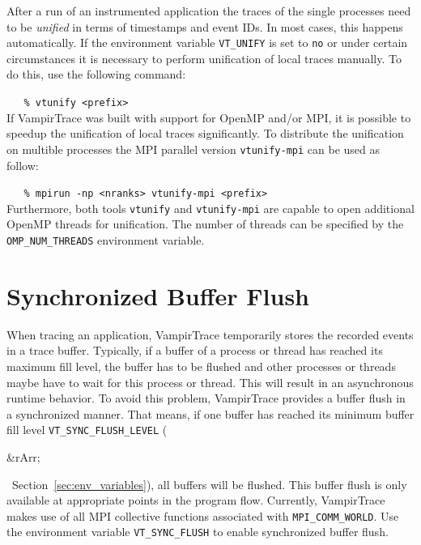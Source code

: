 \documentclass[a4paper,twoside,12pt,BCOR12mm]{scrbook}
\newcommand{\rarr}{$\Rightarrow$}  %
\renewcommand{\rarr}{\begin{rawhtml}&rArr;\end{rawhtml}}   %
\begin{document}
After a run of an instrumented application the traces of the single
processes need to be \textit{unified} in terms of timestamps and event IDs.
In most cases, this happens automatically.
If the environment variable \texttt{VT\_UNIFY} is set to \texttt{no} or under
certain circumstances it is necessary to perform unification of local traces
manually. To do this, use the following command:

\vspace{1ex}
\verb|   % vtunify <prefix>|
\vspace{1ex}\\

If VampirTrace was built with support for OpenMP and/or MPI, it is possible to
speedup the unification of local traces significantly. To distribute the unification
on multible processes the MPI parallel version \texttt{vtunify-mpi} can be used as
follow:

\vspace{1ex}
\verb|   % mpirun -np <nranks> vtunify-mpi <prefix>|
\vspace{1ex}\\

Furthermore, both tools \texttt{vtunify} and \texttt{vtunify-mpi} are capable to
open additional OpenMP threads for unification. The number of threads can be specified
by the \texttt{OMP\_NUM\_THREADS} environment variable.

\section{Synchronized Buffer Flush}
\label{sec:buffer_flush}
When tracing an application, VampirTrace temporarily stores the recorded events
in a trace buffer. Typically, if a buffer of a process or thread has reached its
maximum fill level, the buffer has to be flushed and other processes or threads maybe 
have to wait for this process or thread. This will result in an asynchronous
runtime behavior. \newline
To avoid this problem, VampirTrace provides a buffer flush in a synchronized 
manner. That means, if one buffer has reached its minimum buffer fill level 
\texttt{VT\_SYNC\_FLUSH\_LEVEL} (\rarr\ Section~\ref{sec:env_variables}), all
buffers will be flushed.
This buffer flush is only available at appropriate points in the program flow. 
Currently, VampirTrace makes use of all MPI collective functions associated with 
\latex{\\} \texttt{MPI\_COMM\_WORLD}. Use the environment variable 
\texttt{VT\_SYNC\_FLUSH} to enable synchronized buffer flush.
\end{document}
